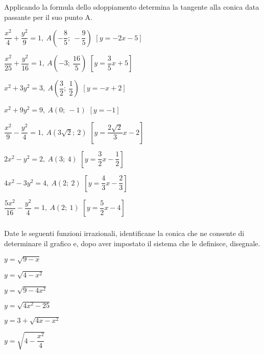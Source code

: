 \begin{esercizio}
  \label{ese:div.003}
  Applicando la formula dello sdoppiamento determina la tangente alla 
conica data passante per il suo punto A.
  \begin{enumeratea}
\item \(\dfrac{x^{2}}{4}+\dfrac{y^{2}}{9}=1,~A\left(-\dfrac{8}{5};~- 
\dfrac{9}{5}\right)\)  
\hfill \(\left[y=-2x-5\right]\)
\item \(\dfrac{x^{2}}{25}+\dfrac{y^{2}}{16}=1,~A\left(-3;~\dfrac{16}{5} 
\right)\)
\hfill \(\left[y=\dfrac{3}{5}x+5\right]\)
\item \(x^{2}+3y^{2}=3,~A\left(\dfrac{3}{2};~\dfrac{1}{2} \right)\)
\hfill \(\left[y=-x+2\right]\)
\item \(x^{2}+9y^{2}=9,~A(0;~-1)\)
\hfill \(\left[y=-1\right]\)
\item \(\dfrac{x^{2}}{9}-\dfrac{y^{2}}{4}=1,~A\left(3\sqrt{2};~2\right)\)
\hfill \(\left[y=\dfrac{2\sqrt{2}}{3}x-2\right]\)
\item \(2x^{2}-y^{2}=2,~A(3;~4)\)
\hfill \(\left[y=\dfrac{3}{2}x-\dfrac{1}{2}\right]\)
\item \(4x^{2}-3y^{2}=4,~A(2;~2)\)
\hfill \(\left[y=\dfrac{4}{3}x-\dfrac{2}{3}\right]\)
\item \(\dfrac{5x^{2}}{16}-\dfrac{y^{2}}{4}=1,~A(2;~1)\)
\hfill\(\left[y=\dfrac{5}{2}x-4\right]\)
\end{enumeratea}
\end{esercizio}


\subsubsection*{}

\begin{esercizio}
  \label{ese:div.003}
  Date le seguenti funzioni irrazionali, identificane la conica che 
ne consente di determinare il grafico e, dopo aver impostato il sistema che 
le definisce, disegnale. 
  \begin{enumeratea}
    \item \( y=\sqrt{9-x} \)
    \item \(y=\sqrt{4-x^{2}}  \)
    \item \( y=\sqrt{9-4x^{2}} \)
    \item \( y=\sqrt{4x^{2}-25} \)
    \item \( y=3+\sqrt{4x-x^{2}} \)
    \item \( y=\sqrt{4-\dfrac{x^{2}}{4}} \)
  \end{enumeratea}
\end{esercizio}


% 
% 
